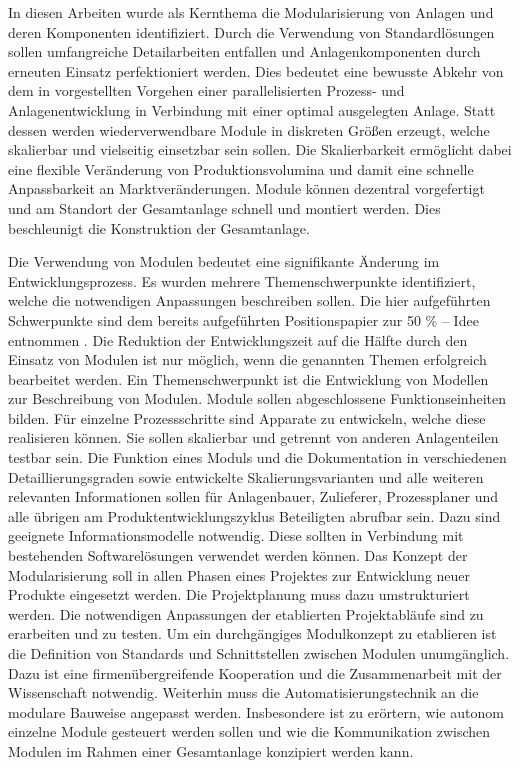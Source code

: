 In diesen Arbeiten wurde als Kernthema die Modularisierung von Anlagen und deren Komponenten identifiziert. Durch die Verwendung von Standardl\"osungen sollen umfangreiche Detailarbeiten entfallen und Anlagenkomponenten durch erneuten Einsatz perfektioniert werden. Dies bedeutet eine bewusste Abkehr von dem in \cite{Dietz_2000} vorgestellten Vorgehen einer parallelisierten Prozess- und Anlagenentwicklung in Verbindung mit einer optimal ausgelegten Anlage. Statt dessen werden wiederverwendbare Module in diskreten Gr\"o\ss{}en erzeugt, welche skalierbar und vielseitig einsetzbar sein sollen. Die Skalierbarkeit erm\"oglicht dabei eine flexible Ver\"anderung von Produktionsvolumina und damit eine schnelle Anpassbarkeit an Marktver\"anderungen. Module k\"onnen dezentral vorgefertigt und am Standort der Gesamtanlage schnell und montiert werden. Dies beschleunigt die Konstruktion der Gesamtanlage. \hfill \newline

Die Verwendung von Modulen bedeutet eine signifikante \"Anderung im Entwicklungsprozess. Es wurden mehrere Themenschwerpunkte identifiziert, welche die notwendigen Anpassungen beschreiben sollen. Die hier aufgef\"uhrten Schwerpunkte sind dem bereits aufgef\"uhrten Positionspapier zur 50 \% -- Idee entnommen \cite{Processnet_2010}.  Die Reduktion der Entwicklungszeit auf die H\"alfte durch den Einsatz von Modulen ist nur m\"oglich, wenn die genannten Themen erfolgreich bearbeitet werden. \hfill \newline
Ein Themenschwerpunkt ist die Entwicklung von Modellen zur Beschreibung von Modulen. Module sollen abgeschlossene Funktionseinheiten bilden. F\"ur einzelne Prozessschritte sind Apparate zu entwickeln, welche diese realisieren k\"onnen. Sie sollen skalierbar und getrennt von anderen Anlagenteilen testbar sein. \hfill \newline
Die Funktion eines Moduls und die Dokumentation in verschiedenen Detaillierungsgraden sowie entwickelte Skalierungsvarianten und alle weiteren relevanten Informationen sollen f\"ur Anlagenbauer, Zulieferer, Prozessplaner und alle \"ubrigen am Produktentwicklungszyklus Beteiligten abrufbar sein. Dazu sind geeignete Informationsmodelle notwendig. Diese sollten in Verbindung mit bestehenden Softwarel\"osungen verwendet werden k\"onnen. \hfill \newline
Das Konzept der Modularisierung soll in allen Phasen eines Projektes zur Entwicklung neuer Produkte eingesetzt werden. Die Projektplanung muss dazu umstrukturiert werden. Die notwendigen Anpassungen der etablierten Projektabl\"aufe sind zu erarbeiten und zu testen. \hfill \newline
Um ein durchg\"angiges Modulkonzept zu etablieren ist die Definition von Standards und Schnittstellen zwischen Modulen unumg\"anglich. Dazu ist eine firmen\"ubergreifende Kooperation und die Zusammenarbeit mit der Wissenschaft notwendig. \hfill \newline
Weiterhin muss die Automatisierungstechnik an die modulare Bauweise angepasst werden. Insbesondere ist zu er\"ortern, wie autonom einzelne Module gesteuert werden sollen und wie die Kommunikation zwischen Modulen im Rahmen einer Gesamtanlage konzipiert werden kann. \hfill \newline

